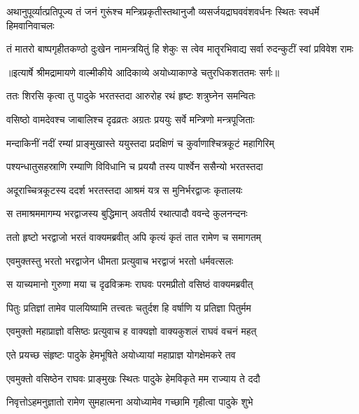 \fourlineindentedshloka
{अथानुपूर्व्यात्प्रतिपूज्य तं जनं}
{ गुरूंश्च मन्त्रिप्रकृतीस्तथानुजौ}
{व्यसर्जयद्राघववंशवर्धनः}
{ स्थितः स्वधर्मे हिमवानिवाचलः} %

\fourlineindentedshloka
{तं मातरो बाष्पगृहीतकण्ठो}
{ दुःखेन नामन्त्रयितुं हि शेकुः}
{स त्वेव मातॄरभिवाद्य सर्वा}
{ रुदन्कुटीं स्वां प्रविवेश रामः} %


{॥इत्यार्षे श्रीमद्रामायणे वाल्मीकीये आदिकाव्ये अयोध्याकाण्डे चतुरधिकशततमः सर्गः॥}


\twolineshloka
{ततः शिरसि कृत्वा तु पादुके भरतस्तदा}
{आरुरोह रथं हृष्टः शत्रुघ्नेन समन्वितः} %

\twolineshloka
{वसिष्ठो वामदेवश्च जाबालिश्च दृढव्रतः}
{अग्रतः प्रययुः सर्वे मन्त्रिणो मन्त्रपूजिताः} %

\twolineshloka
{मन्दाकिनीं नदीं रम्यां प्राङ्मुखास्ते ययुस्तदा}
{प्रदक्षिणं च कुर्वाणाश्चित्रकूटं महागिरिम्} %

\twolineshloka
{पश्यन्धातुसहस्राणि रम्याणि विविधानि च}
{प्रययौ तस्य पार्श्वेन ससैन्यो भरतस्तदा} %

\twolineshloka
{अदूराच्चित्रकूटस्य ददर्श भरतस्तदा}
{आश्रमं यत्र स मुनिर्भरद्वाजः कृतालयः} %

\twolineshloka
{स तमाश्रममागम्य भरद्वाजस्य बुद्धिमान्}
{अवतीर्य रथात्पादौ ववन्दे कुलनन्दनः} %

\twolineshloka
{ततो हृष्टो भरद्वाजो भरतं वाक्यमब्रवीत्}
{अपि कृत्यं कृतं तात रामेण च समागतम्} %

\twolineshloka
{एवमुक्तस्तु भरतो भरद्वाजेन धीमता}
{प्रत्युवाच भरद्वाजं भरतो धर्मवत्सलः} %

\twolineshloka
{स याच्यमानो गुरुणा मया च दृढविक्रमः}
{राघवः परमप्रीतो वसिष्ठं वाक्यमब्रवीत्} %

\twolineshloka
{पितुः प्रतिज्ञां तामेव पालयिष्यामि तत्त्वतः}
{चतुर्दश हि वर्षाणि य प्रतिज्ञा पितुर्मम} %

\twolineshloka
{एवमुक्तो महाप्राज्ञो वसिष्ठः प्रत्युवाच ह}
{वाक्यज्ञो वाक्यकुशलं राघवं वचनं महत्} %

\twolineshloka
{एते प्रयच्छ संहृष्टः पादुके हेमभूषिते}
{अयोध्यायां महाप्राज्ञ योगक्षेमकरे तव} %

\twolineshloka
{एवमुक्तो वसिष्ठेन राघवः प्राङ्मुखः स्थितः}
{पादुके हेमविकृते मम राज्याय ते ददौ} %

\twolineshloka
{निवृत्तोऽहमनुज्ञातो रामेण सुमहात्मना}
{अयोध्यामेव गच्छामि गृहीत्वा पादुके शुभे} %

